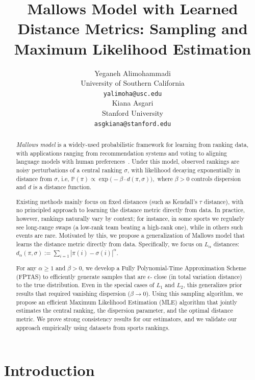 \documentclass{article}
\title{Mallows Model with Learned Distance Metrics: Sampling and Maximum Likelihood Estimation}
\author{%
  Yeganeh Alimohammadi\\
  University of Southern California\\
  \texttt{yalimoha@usc.edu}\\
  \And
  Kiana Asgari\\
  Stanford University\\
  \texttt{asgkiana@stanford.edu}\\
}
\renewcommand{\P}{\mathbb{P}}
\begin{document}
\maketitle


\begin{abstract}

 \textit{Mallows model} is a widely-used probabilistic framework for learning from ranking data, with applications ranging from recommendation systems and voting to aligning language models with human preferences~\cite{chen2024mallows, kleinberg2021algorithmic, rafailov2024direct}. Under this model, observed rankings are noisy perturbations of a central ranking $\sigma$, with likelihood decaying exponentially in distance from $\sigma$, i.e,
$\P (\pi) \propto \exp\big(-\beta \cdot d(\pi, \sigma)\big),$
where $\beta > 0$ controls dispersion and $d$ is a distance function.




Existing methods mainly focus on fixed distances (such as Kendall's $\tau$ distance), with no principled approach to learning the distance metric directly from data. In practice, however, rankings naturally vary by context; for instance, in some sports we regularly see long-range swaps (a low-rank team beating a high-rank one), while in
others such events are rare. 
Motivated by this, we propose a generalization of Mallows model  that learns the distance metric directly from data. Specifically, we focus on $L_\alpha$ distances:
$d_\alpha(\pi,\sigma):=\sum_{i=1} |\pi(i)-\sigma(i)|^\alpha$.

For any $\alpha\geq 1$ and $\beta>0$, we develop a Fully Polynomial-Time Approximation Scheme (FPTAS) to efficiently generate samples that are $\epsilon$- close  (in total variation distance) to the true distribution. Even in the special cases of  $L_1$ and $L_2$, this generalizes prior results that required vanishing dispersion ($\beta\to0$).
Using this sampling algorithm, we propose an efficient Maximum Likelihood Estimation (MLE) algorithm that jointly estimates the central ranking, the dispersion parameter, and the optimal distance metric. We prove strong consistency results for our estimators, and we validate our approach empirically using datasets from sports rankings.

\end{abstract}

\section{Introduction}
\end{document}
